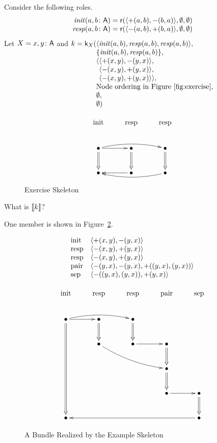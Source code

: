 \documentclass[12pt]{report}
\theoremstyle{definition}
\newcommand{\role}{\mathsf{r}}
\newcommand{\skel}{\mathsf{k}}
\newcommand{\init}{\fn{init}}
\newcommand{\resp}{\fn{resp}}
\begin{document}
Consider the following roles.
$$\begin{array}{r@{{}={}}l}
\init(a,b\colon\srt{A})&\role(\seq{\outbnd(a,b),\inbnd(b,a)},
\emptyset,\emptyset)\\
\resp(a,b\colon\srt{A})&\role(\seq{\inbnd(a,b),\outbnd(b,a)},
\emptyset,\emptyset)
\end{array}$$
Let $X=x,y\colon\mathsf{A}$ and
$\begin{array}[t]{@{}r@{}l}
k=\skel_X(
&\seq{\init(a,b),\resp(a,b),\resp(a,b)},\\
&\{\init(a,b),\resp(a,b)\},\\
&\seq{\begin{array}[t]{@{}l}
\seq{\outbnd(x,y),\inbnd(y,x)},\\
\seq{\inbnd(x,y),\outbnd(y,x)},\\
\seq{\inbnd(x,y),\outbnd(y,x)}},
\end{array}\\
&\mbox{Node ordering in Figure~\ref{fig:exercise}},\\
&\emptyset,\\
&\emptyset)
\end{array}$

\begin{figure}
$$\xymatrix{
\txt{\strut init}&\txt{\strut resp}&\txt{\strut resp}\\
\bullet\ar@{=>}[d]\ar@/^/[rr]\ar[r]&\bullet\ar@{=>}[d]&\bullet\ar@{=>}[d]\\
\bullet&\bullet\ar[l]&\bullet\ar@/^/[ll]}$$
\caption{Exercise Skeleton}\label{fig:exercise}
\end{figure}

What is $[\![k]\!]$?

One member is shown in Figure~\ref{fig:bundle}.

\begin{figure}
$$\begin{array}{ll}
\mbox{init}&\langle\mathord +(x,y),\mathord -(y,x)\rangle\\
\mbox{resp}&\langle\mathord -(x,y),\mathord +(y,x)\rangle\\
\mbox{resp}&\langle\mathord -(x,y),\mathord +(y,x)\rangle\\
\mbox{pair}&\langle\mathord -(y,x),\mathord -(y,x),\mathord +((y,x),(y,x))\rangle\\
\mbox{sep}&\langle\mathord -((y,x),(y,x)),\mathord +(y,x)\rangle
\end{array}$$

$$\xymatrix{
\txt{\strut init}&\txt{\strut resp}&\txt{\strut resp}&\txt{\strut pair}&\txt{\strut sep}\\
\bullet\ar@{=>}[dddd]\ar@/^/[rr]\ar[r]&\bullet\ar@{=>}[d]&\bullet\ar@{=>}[d]&&\\
&\bullet\ar@/_/[rrd]&\bullet\ar[r]&\bullet\ar@{=>}[d]&\\
&&&\bullet\ar@{=>}[d]&\\
&&&\bullet\ar[r]&\bullet\ar@{=>}[d]\\
\bullet&&&&\bullet\ar[llll]}$$
\caption{A Bundle Realized by the Example Skeleton}\label{fig:bundle}
\end{figure}
\end{document}
